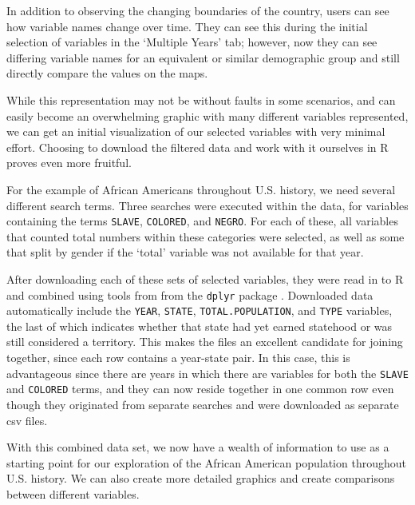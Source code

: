 \documentclass[DIV=calc, paper=a4, fontsize=10pt, twocolumn]{scrartcl}\usepackage[]{graphicx}\usepackage[]{color}
\begin{document}
\par In addition to observing the changing boundaries of the country, users can see how variable names change over time. They can see this during the initial selection of variables in the `Multiple Years' tab; however, now they can see differing variable names for an equivalent or similar demographic group and still directly compare the values on the maps. 

\par While this representation may not be without faults in some scenarios, and can easily become an overwhelming graphic with many different variables represented, we can get an initial visualization of our selected variables with very minimal effort. Choosing to download the filtered data and work with it ourselves in R proves even more fruitful.  

\par For the example of African Americans throughout U.S. history, we need several different search terms. Three searches were executed within the data, for variables containing the terms \texttt{SLAVE}, \texttt{COLORED}, and \texttt{NEGRO}. For each of these, all variables that counted total numbers within these categories were selected, as well as some that split by gender if the `total' variable was not available for that year. 

\par After downloading each of these sets of selected variables, they were read in to R and combined using tools from from the \texttt{dplyr} package \citep{dplyr}. Downloaded data automatically include the \texttt{YEAR}, \texttt{STATE}, \texttt{TOTAL.POPULATION}, and \texttt{TYPE} variables, the last of which indicates whether that state had yet earned statehood or was still considered a territory. This makes the files an excellent candidate for joining together, since each row contains a year-state pair. In this case, this is advantageous since there are years in which there are variables for both the \texttt{SLAVE} and \texttt{COLORED} terms, and they can now reside together in one common row even though they originated from separate searches and were downloaded as separate csv files. 

\par With this combined data set, we now have a wealth of information to use as a starting point for our exploration of the African American population throughout U.S. history. We can also create more detailed graphics and create comparisons between different variables.  
\end{document}
